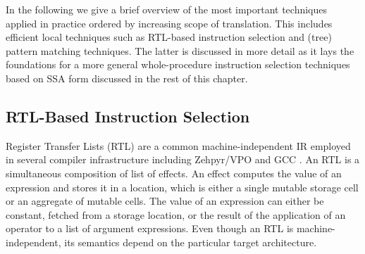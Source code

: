 In the following we give a brief overview of the most important
techniques applied in practice ordered by increasing scope of
translation. This includes efficient local techniques such as
RTL-based instruction selection and (tree) pattern matching
techniques. The latter is discussed in more detail as it lays the
foundations for a more general whole-procedure instruction selection
techniques based on SSA form discussed in the rest of this chapter.

\subsection{RTL-Based Instruction Selection}
Register Transfer Lists (RTL) are a common machine-independent
IR employed in several compiler infrastructure
including Zehpyr/VPO \cite{Ramsey98} and GCC \cite{wwwGCC}. An RTL is a
simultaneous composition of list of effects. An effect computes the
value of an expression and stores it in a location, which is either a
single mutable storage cell or an aggregate of mutable cells. The
value of an expression can either be constant, fetched from a storage
location, or the result of the application of an operator to a list
of argument expressions. Even though an RTL is machine-independent,
its semantics depend on the particular target architecture.


